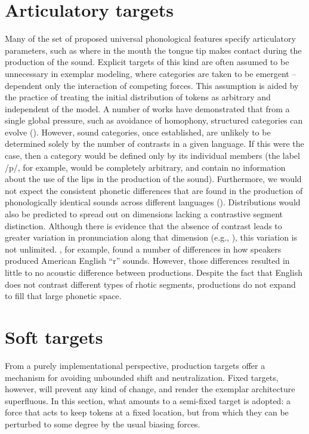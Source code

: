 \section{Articulatory targets}

Many of the set of proposed universal phonological features specify
articulatory parameters, such as where in the mouth the tongue tip
makes contact during the production of the sound. Explicit targets
of this kind are often assumed to be unnecessary in exemplar modeling,
where categories are taken to be emergent – dependent only the interaction
of competing forces. This assumption is aided by the practice of treating
the initial distribution of tokens as arbitrary and independent of
the model. A number of works have demonstrated that from a single
global pressure, such as avoidance of homophony, structured categories
can evolve (\citealt{Boer2000,Wedel2006,soskuthy2013phonetic}). However,
sound categories, once established, are unlikely to be determined
solely by the number of contrasts in a given language. If this were
the case, then a category would be defined only by its individual
members (the label {/p/}, for example, would be completely
arbitrary, and contain no information about the use of the lips in
the production of the sound). Furthermore, we would not expect the
consistent phonetic differences that are found in the production of
phonologically identical sounds across different languages (\citealt{Keating1985}).
Distributions would also be predicted to spread out on dimensions
lacking a contrastive segment distinction. Although there is evidence
that the absence of contrast leads to greater variation in pronunciation
along that dimension (e.g., \citealt{choi1995acoustic}), this variation
is not unlimited. \citet{Baker2011}, for example, found a number
of differences in how speakers produced American English “r”
sounds. However, those differences resulted in little to no acoustic
difference between productions. Despite the fact that English does
not contrast different types of rhotic segments, productions do not
expand to fill that large phonetic space. 

\section{\label{subsec:Soft-Targets}Soft targets}

From a purely implementational perspective, production targets offer
a mechanism for avoiding unbounded shift and neutralization. Fixed
targets, however, will prevent any kind of change, and render the
exemplar architecture superfluous. In this section, what amounts to
a semi-fixed target is adopted: a force that acts to keep tokens at
a fixed location, but from which they can be perturbed to some degree
by the usual biasing forces. 

